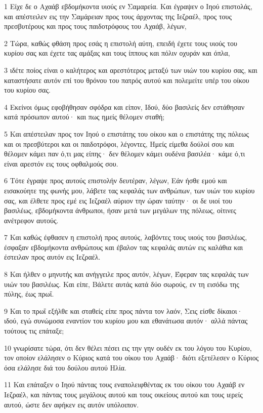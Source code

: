 \par 1 Είχε δε ο Αχαάβ εβδομήκοντα υιούς εν Σαμαρεία. Και έγραψεν ο Ιηού επιστολάς, και απέστειλεν εις την Σαμάρειαν προς τους άρχοντας της Ιεζραέλ, προς τους πρεσβυτέρους και προς τους παιδοτρόφους του Αχαάβ, λέγων,
\par 2 Τώρα, καθώς φθάση προς εσάς η επιστολή αύτη, επειδή έχετε τους υιούς του κυρίου σας και έχετε τας αμάξας και τους ίππους και πόλιν οχυράν και όπλα,
\par 3 ιδέτε ποίος είναι ο καλήτερος και αρεστότερος μεταξύ των υιών του κυρίου σας, και καταστήσατε αυτόν επί του θρόνου του πατρός αυτού και πολεμείτε υπέρ του οίκου του κυρίου σας.
\par 4 Εκείνοι όμως εφοβήθησαν σφόδρα και είπον, Ιδού, δύο βασιλείς δεν εστάθησαν κατά πρόσωπον αυτού· και πως ημείς θέλομεν σταθή;
\par 5 Και απέστειλαν προς τον Ιηού ο επιστάτης του οίκου και ο επιστάτης της πόλεως και οι πρεσβύτεροι και οι παιδοτρόφοι, λέγοντες, Ημείς είμεθα δούλοί σου και θέλομεν κάμει παν ό,τι μας είπης· δεν θέλομεν κάμει ουδένα βασιλέα· κάμε ό,τι είναι αρεστόν εις τους οφθαλμούς σου.
\par 6 Τότε έγραψε προς αυτούς επιστολήν δευτέραν, λέγων, Εάν ήσθε εμού και εισακούητε της φωνής μου, λάβετε τας κεφαλάς των ανθρώπων, των υιών του κυρίου σας, και έλθετε προς εμέ εις Ιεζραέλ αύριον την ώραν ταύτην· οι δε υιοί του βασιλέως, εβδομήκοντα άνθρωποι, ήσαν μετά των μεγάλων της πόλεως, οίτινες ανέτρεφον αυτούς.
\par 7 Και καθώς έφθασεν η επιστολή προς αυτούς, λαβόντες τους υιούς του βασιλέως, έσφαξαν εβδομήκοντα ανθρώπους και έβαλον τας κεφαλάς αυτών εις καλάθια και έστειλαν προς αυτόν εις Ιεζραέλ.
\par 8 Και ήλθεν ο μηνυτής και ανήγγειλε προς αυτόν, λέγων, Έφεραν τας κεφαλάς των υιών του βασιλέως. Και είπε, Βάλετε αυτάς κατά δύο σωρούς, εν τη εισόδω της πύλης, έως πρωΐ.
\par 9 Και το πρωΐ εξήλθε και σταθείς είπε προς πάντα τον λαόν, Σεις είσθε δίκαιοι· ιδού, εγώ συνώμοσα εναντίον του κυρίου μου και εθανάτωσα αυτόν· αλλά πάντας τούτους τις επάταξε;
\par 10 γνωρίσατε τώρα, ότι δεν θέλει πέσει εις την γην ουδέν εκ του λόγου του Κυρίου, τον οποίον ελάλησεν ο Κύριος κατά του οίκου του Αχαάβ· διότι εξετέλεσεν ο Κύριος όσα ελάλησε διά του δούλου αυτού Ηλία.
\par 11 Και επάταξεν ο Ιηού πάντας τους εναπολειφθέντας εκ του οίκου του Αχαάβ εν Ιεζραέλ, και πάντας τους μεγάλους αυτού και τους οικείους αυτού και τους ιερείς αυτού, ώστε δεν αφήκεν εις αυτόν υπόλοιπον.

